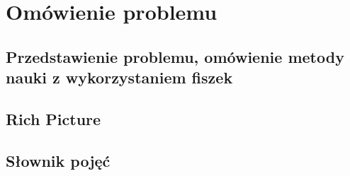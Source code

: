 \chapter{Omówienie problemu}

\section{Przedstawienie problemu, omówienie metody nauki z wykorzystaniem fiszek}
\section{Rich Picture}
\section{Słownik pojęć}
